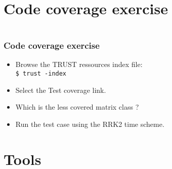 \documentclass[10pt, hyperref={unicode=true,pdfusetitle, bookmarks=true,bookmarksnumbered=false,bookmarksopen=false, breaklinks=false,pdfborder={0 0 1},backref=true,colorlinks=true,linkcolor=darkblue,pageanchor, urlcolor=darkblue}]{beamer}
\begin{document}
\section{{\bf{Code coverage exercise}}}
\begin{frame}
\begin{columns}[c] 
\tableofcontents[sections={1-3},currentsection, currentsubsection]
\tableofcontents[sections={4-8},currentsection, currentsubsection]
\end{columns}
\end{frame}
\begin{frame}
\frametitle{Code coverage exercise}
\begin{block}{}

\begin{itemize}
\item Browse the TRUST ressources index file:\\
\texttt{\$ trust -index}

\item Select the Test coverage link.

\item Which is the less covered matrix class ?

\item Run the test case using the RRK2 time scheme.
\end{itemize}

\end{block}
\end{frame}



\section{{\bf{Tools}}}
\end{document}
